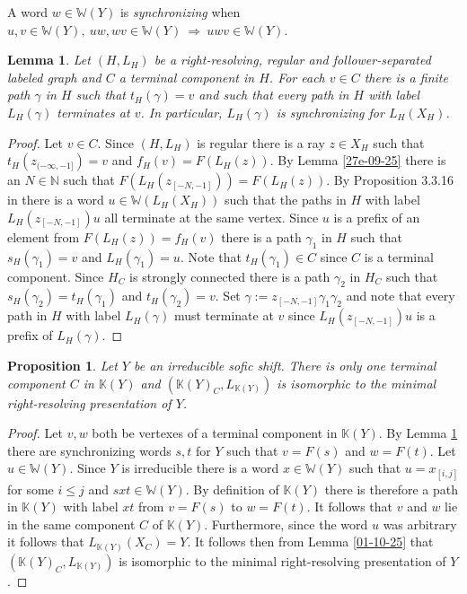 \documentclass[12pt,oneside,english]{amsart}
\newtheorem{lemma}[thm]{Lemma}
\newtheorem{prop}[thm]{Proposition}
\begin{document}
 A word $w \in \mathbb W(Y)$ is \emph{synchronizing} when 
$u,v \in \mathbb W(Y), \ uw,wv \in \mathbb W(Y) \ \Rightarrow \ uwv \in \mathbb W(Y)$.
\begin{lemma}\label{01-10-25a} Let $(H,L_H)$ be a right-resolving, regular and follower-separated labeled graph and $C$ a terminal component in $H$. For each $v \in C$ there is a finite path $\gamma$ in $H$ such that $t_H(\gamma) = v$ and such that every path in $H$ with label $L_H(\gamma)$ terminates at $v$. In particular, $L_H(\gamma)$ is synchronizing for $L_H(X_H)$.
\end{lemma}
\begin{proof} Let $v \in C$. Since $(H,L_H)$ is regular there is a ray $z \in X_H$ such that $t_H(z_{(-\infty,-1]}) = v$ and $f_H(v) = F(L_H(z))$. By Lemma \ref{27e-09-25} there is an $N \in \mathbb N$ such that $F(L_H(z_{[-N,-1]})) = F(L_H(z))$. By Proposition 3.3.16 in \cite{LM} there is a word $u \in \mathbb W(L_H(X_H))$ such that the paths in $H$ with label $L_H(z_{[-N,-1]})u$ all terminate at the same vertex. Since $u$ is a prefix of an element from $F(L_H(z)) = f_H(v)$ there is a path $\gamma_1$ in $H$ such that $s_H(\gamma_1) =v$ and $L_H(\gamma_1) = u$. Note that $t_H(\gamma_1) \in C$ since $C$ is a terminal component. Since $H_C$ is strongly connected there is a path $\gamma_2$ in $H_C$ such that $s_H(\gamma_2) = t_H(\gamma_1)$ and $t_H(\gamma_2) = v$. Set $\gamma :=z_{[-N,-1]}\gamma_1\gamma_2$ and note that every path in $H$ with label $L_H(\gamma)$ must terminate at $v$ since $L_H(z_{[-N,-1]})u$ is a prefix of $L_H(\gamma)$. 
\end{proof}






\begin{prop}\label{29-09-25bx} Let $Y$ be an irreducible sofic shift. There is only one terminal component $C$ in $\mathbb K(Y)$ and $(\mathbb K(Y)_C,L_{\mathbb K(Y)})$ is isomorphic to the minimal right-resolving presentation of $Y$.
\end{prop}
\begin{proof} Let $v,w$ both be vertexes of a terminal component in $\mathbb K(Y)$. By Lemma \ref{01-10-25a} there are synchronizing words $s,t$ for $Y$ such that $v = F(s)$ and $w = F(t)$. Let $u \in \mathbb W(Y)$. Since $Y$ is irreducible there is a word $x \in \mathbb W(Y)$ such that $ u =x_{[i,j]}$ for some $i \leq j$ and $sxt \in \mathbb W(Y)$. By definition of $\mathbb K(Y)$ there is therefore a path in $\mathbb K(Y)$ with label $xt$ from $v=F(s)$ to $w = F(t)$. It follows that $v$ and $w$ lie in the same component $C$ of $\mathbb K(Y)$. Furthermore, since the word $u$ was arbitrary it follows that $L_{\mathbb K(Y)}(X_C) = Y$. It follows then from Lemma \ref{01-10-25} that $(\mathbb K(Y)_C,L_{\mathbb K(Y)})$ is isomorphic to the minimal right-resolving presentation of $Y$.
\end{proof}
\end{document}

